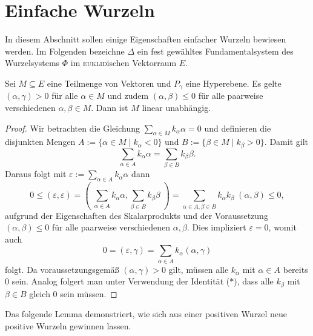 \section{Einfache Wurzeln}
\label{sec:einfach}

In diesem Abschnitt sollen einige Eigenschaften einfacher Wurzeln bewiesen werden.  
Im Folgenden bezeichne $\Delta$ ein fest gewähltes Fundamentalsystem des Wurzelsystems $\Phi$ im \textsc{euklid}ischen Vektorraum $E$.

\begin{lem}
  \label{lem:independentSet}
  Sei $M \subseteq E$ eine Teilmenge von Vektoren und $P_\gamma$ eine Hyperebene.
  Es gelte $(\alpha, \gamma) > 0$ für alle $\alpha \in M$ und zudem $(\alpha, \beta) \leq 0$ für alle paarweise verschiedenen $\alpha, \beta \in M$.
  Dann ist $M$ linear unabhängig.
\end{lem}

\begin{proof}
  Wir betrachten die Gleichung $\sum_{\alpha \in M} k_\alpha \alpha = 0$ und definieren die disjunkten Mengen $A := \{\alpha \in M \mid k_\alpha < 0\}$ und  $B := \{\beta \in M \mid k_\beta > 0\}$. 
  Damit gilt 
  \begin{displaymath}
    \sum_{\alpha \in A} k_\alpha \alpha = \sum_{\beta \in B} k_\beta \beta \tag{$\ast$}.
  \end{displaymath}
  Daraus folgt mit $\varepsilon := \sum_{\alpha \in A} k_\alpha \alpha$ dann
  \begin{displaymath}
    0 
    \leq (\varepsilon, \varepsilon) 
    = (\;\sum_{\alpha \in A} k_\alpha \alpha,\sum_{\beta \in B} k_\beta \beta\;) 
    = \sum_{\alpha \in A, \beta \in B} k_\alpha k_\beta \; (\alpha, \beta) 
    \leq 0,
  \end{displaymath}
  aufgrund der Eigenschaften des Skalarprodukts und der Voraussetzung $(\alpha, \beta) \leq 0$ für alle paarweise verschiedenen $\alpha, \beta$.
  Dies impliziert $\varepsilon = 0$, womit auch 
  \begin{displaymath}
    0 = (\varepsilon, \gamma) = \sum_{\alpha \in A} k_\alpha (\alpha, \gamma)
  \end{displaymath}
  folgt. Da voraussetzungsgemäß $(\alpha, \gamma) > 0$ gilt, müssen alle $k_\alpha$ mit $\alpha \in A$ bereits $0$ sein.
  Analog folgert man unter Verwendung der Identität ($\ast$), dass alle $k_\beta$ mit $\beta \in B$ gleich $0$ sein müssen.
\end{proof}

Das folgende Lemma demonstriert, wie sich aus einer positiven Wurzel neue positive Wurzeln gewinnen lassen.

